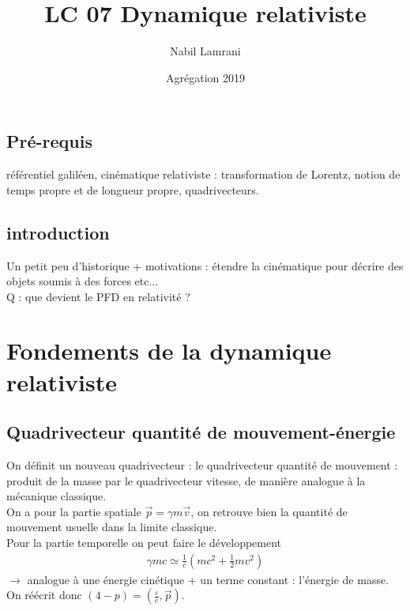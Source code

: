 \documentclass[12pt,prb,aps,epsf]{article}
\begin{document}
	
	\title{LC 07 Dynamique relativiste}
	\author{Nabil Lamrani}
	\date{Agrégation 2019}

	\maketitle
	
	\tableofcontents
	
	\pagebreak

\subsection*{Pré-requis}
référentiel galiléen, cinématique relativiste : transformation de Lorentz, notion de temps propre et de longueur propre, quadrivecteurs.


\subsection{introduction}
Un petit peu d'historique + motivations : étendre la cinématique pour décrire des objets soumis à des forces etc...\\
Q  :  que devient le PFD en relativité ?

\section{Fondements de la dynamique relativiste}

\subsection{Quadrivecteur quantité de mouvement-énergie}
On définit un nouveau quadrivecteur : le quadrivecteur quantité de mouvement : produit de la masse par le quadrivecteur vitesse, de manière analogue à la mécanique classique.\\
On a pour la partie spatiale $\vec{p} = \gamma m \vec{v}$, on retrouve bien la quantité de mouvement usuelle dans la limite classique.\\

Pour la partie temporelle on peut faire le développement 
\begin{eqnarray}
\gamma m c \simeq \frac{1}{c}\left(mc^2+ \frac{1}{2}mv^2\right)
\end{eqnarray}
$\rightarrow$ analogue à une énergie cinétique + un terme constant : l'énergie de masse.\\
On réécrit donc $(4-p) = (\frac{\varepsilon}{c}, \vec{p})$.
\end{document}
